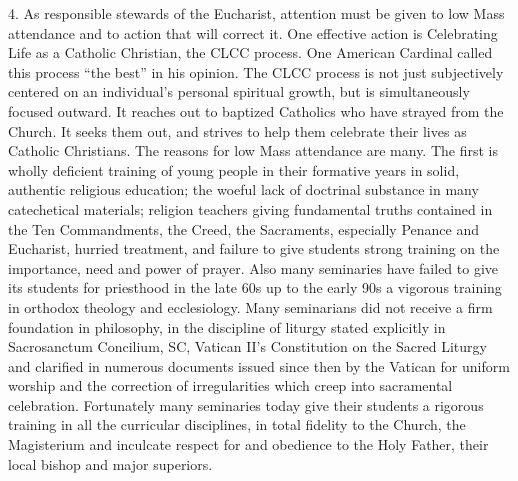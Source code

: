 \documentclass[oneside]{book}
\begin{document}
4. As responsible stewards of the Eucharist, attention must be given to low Mass
attendance and to action that will correct it. One effective action is
Celebrating Life as a Catholic Christian, the CLCC process. One American
Cardinal called this process ``the best'' in his opinion. The CLCC process is
not just subjectively centered on an individual's personal spiritual growth, but
is simultaneously focused outward. It reaches out to baptized Catholics who have
strayed from the Church. It seeks them out, and strives to help them celebrate
their lives as Catholic Christians. The reasons for low Mass attendance are
many. The first is wholly deficient training of young people in their formative
years in solid, authentic religious education; the woeful lack of doctrinal
substance in many catechetical materials; religion teachers giving fundamental
truths contained in the Ten Commandments, the Creed, the Sacraments, especially
Penance and Eucharist, hurried treatment, and failure to give students strong
training on the importance, need and power of prayer.
Also many seminaries have failed to give its students for priesthood in the late
60s up to the early 90s a vigorous training in orthodox theology and
ecclesiology. Many seminarians did not receive a firm foundation in philosophy,
in the discipline of liturgy stated explicitly in Sacrosanctum Concilium, SC,
Vatican II's Constitution on the Sacred Liturgy and clarified in numerous
documents issued since then by the Vatican for uniform worship and the
correction of irregularities which creep into sacramental
celebration. Fortunately many seminaries today give their students a rigorous
training in all the curricular disciplines, in total fidelity to the Church, the
Magisterium and inculcate respect for and obedience to the Holy Father, their
local bishop and major superiors.
\end{document}

